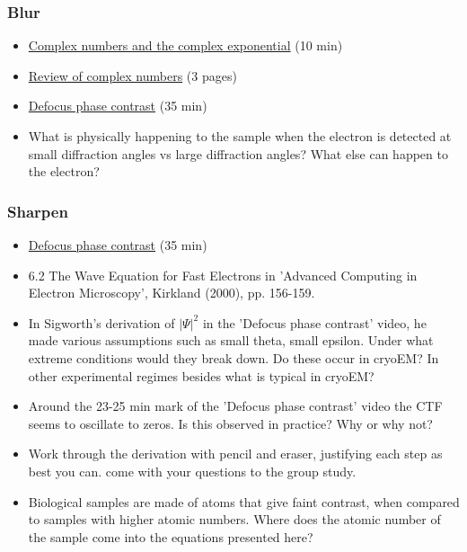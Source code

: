 \documentclass[11pt, oneside]{article}   	%
\begin{document}
\subsubsection{Blur}
\begin{itemize}
\item \href{https://youtu.be/CZkPG95eoS0}{Complex numbers and the complex exponential} (10 min)
\item \href{https://cryoemprinciples.yale.edu/sites/default/files/files/1%20Review%20of%20Complex%20Numbers.pdf}{Review	of complex	numbers} (3 pages)
\item \href{https://youtu.be/FkynXo-vOms}{Defocus phase contrast} (35 min)

\end{itemize}
\begin{itemize}
\item What is physically happening to the sample when the electron is detected at small diffraction angles vs large diffraction angles? What else can happen to the electron?
\end{itemize}

\subsubsection{Sharpen}
\begin{itemize}
	\item \href{https://youtu.be/FkynXo-vOms}{Defocus phase contrast} (35 min)
	\item 6.2 The Wave Equation for Fast Electrons in 'Advanced Computing in Electron Microscopy', Kirkland (2000), pp. 156-159.
\end{itemize}
\begin{itemize}
\item In Sigworth's derivation of $|\Psi|^2$ in the 'Defocus phase contrast' video, he made various assumptions such as small theta, small epsilon. Under what extreme conditions would they break down. Do these occur in cryoEM? In other experimental regimes besides what is typical in cryoEM?
\item Around the 23-25 min mark of the 'Defocus phase contrast' video the CTF seems to oscillate to zeros. Is this observed in practice? Why or why not?
\item Work through the derivation with pencil and eraser, justifying each step as best you can. come with your questions to the group study.
\item Biological samples are made of atoms that give faint contrast, when compared to samples with higher atomic numbers. Where does the atomic number of the sample come into the equations presented here? 
\end{itemize}
\end{document}
